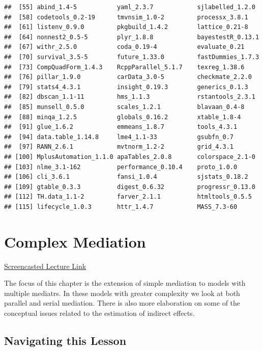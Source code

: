 \documentclass[
  11pt,
]{book}
\begin{document}
\begin{verbatim}
##  [55] abind_1.4-5           yaml_2.3.7            sjlabelled_1.2.0     
##  [58] codetools_0.2-19      tmvnsim_1.0-2         processx_3.8.1       
##  [61] listenv_0.9.0         pkgbuild_1.4.2        lattice_0.21-8       
##  [64] nonnest2_0.5-5        plyr_1.8.8            bayestestR_0.13.1    
##  [67] withr_2.5.0           coda_0.19-4           evaluate_0.21        
##  [70] survival_3.5-5        future_1.33.0         fastDummies_1.7.3    
##  [73] CompQuadForm_1.4.3    RcppParallel_5.1.7    texreg_1.38.6        
##  [76] pillar_1.9.0          carData_3.0-5         checkmate_2.2.0      
##  [79] stats4_4.3.1          insight_0.19.3        generics_0.1.3       
##  [82] dbscan_1.1-11         hms_1.1.3             rstantools_2.3.1     
##  [85] munsell_0.5.0         scales_1.2.1          blavaan_0.4-8        
##  [88] minqa_1.2.5           globals_0.16.2        xtable_1.8-4         
##  [91] glue_1.6.2            emmeans_1.8.7         tools_4.3.1          
##  [94] data.table_1.14.8     lme4_1.1-33           gsubfn_0.7           
##  [97] RANN_2.6.1            mvtnorm_1.2-2         grid_4.3.1           
## [100] MplusAutomation_1.1.0 apaTables_2.0.8       colorspace_2.1-0     
## [103] nlme_3.1-162          performance_0.10.4    proto_1.0.0          
## [106] cli_3.6.1             fansi_1.0.4           sjstats_0.18.2       
## [109] gtable_0.3.3          digest_0.6.32         progressr_0.13.0     
## [112] TH.data_1.1-2         farver_2.1.1          htmltools_0.5.5      
## [115] lifecycle_1.0.3       httr_1.4.7            MASS_7.3-60
\end{verbatim}

\hypertarget{CompMed}{%
\chapter{Complex Mediation}\label{CompMed}}

\href{https://spu.hosted.panopto.com/Panopto/Pages/Viewer.aspx?pid=6991fd3d-22b6-44f5-ab5b-ad1000314b7f}{Screencasted Lecture Link}

The focus of this chapter is the extension of simple mediation to models with multiple mediatrs. In these models with greater complexity we look at both parallel and serial mediation. There is also more elaboration on some of the conceptual issues related to the estimation of indirect effects.

\hypertarget{navigating-this-lesson-5}{%
\section{Navigating this Lesson}\label{navigating-this-lesson-5}}
\end{document}
